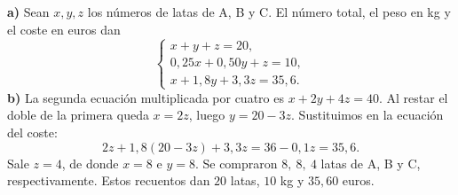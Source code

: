 \textbf{a)} Sean $x,y,z$ los números de latas de A, B y C. El número total, el peso en kg y el coste en euros dan
\[
\begin{cases}
x+y+z=20,\\
0{,}25x+0{,}50y+z=10,\\
x+1{,}8y+3{,}3z=35{,}6.
\end{cases}
\]
\textbf{b)} La segunda ecuación multiplicada por cuatro es $x+2y+4z=40$. Al restar el doble de la primera queda $x=2z$, luego $y=20-3z$. Sustituimos en la ecuación del coste:
\[
2z+1{,}8(20-3z)+3{,}3z=36-0{,}1z=35{,}6.
\]
Sale $z=4$, de donde $x=8$ e $y=8$. Se compraron $\boxed{8,\ 8,\ 4}$ latas de A, B y C, respectivamente. Estos recuentos dan $20$ latas, $10$ kg y $35{,}60$ euros.
